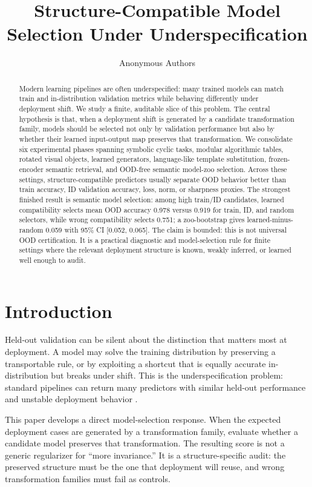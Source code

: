 \documentclass[10pt,twocolumn]{article}
\title{Structure-Compatible Model Selection Under Underspecification}
\author{Anonymous Authors}
\date{}
\begin{document}
\maketitle

\begin{abstract}
Modern learning pipelines are often underspecified: many trained models can
match train and in-distribution validation metrics while behaving differently
under deployment shift. We study a finite, auditable slice of this problem. The
central hypothesis is that, when a deployment shift is generated by a candidate
transformation family, models should be selected not only by validation
performance but also by whether their learned input-output map preserves that
transformation. We consolidate six experimental phases spanning symbolic cyclic
tasks, modular algorithmic tables, rotated visual objects, learned generators,
language-like template substitution, frozen-encoder semantic retrieval, and
OOD-free semantic model-zoo selection. Across these settings,
structure-compatible predictors usually separate OOD behavior better than train
accuracy, ID validation accuracy, loss, norm, or sharpness proxies. The strongest
finished result is semantic model selection: among high train/ID candidates,
learned compatibility selects mean OOD accuracy 0.978 versus 0.919 for train,
ID, and random selectors, while wrong compatibility selects 0.751; a
zoo-bootstrap gives learned-minus-random 0.059 with 95\% CI [0.052, 0.065].
The claim is
bounded: this is not universal OOD certification. It is a practical diagnostic
and model-selection rule for finite settings where the relevant deployment
structure is known, weakly inferred, or learned well enough to audit.
\end{abstract}

\section{Introduction}

Held-out validation can be silent about the distinction that matters most at
deployment. A model may solve the training distribution by preserving a
transportable rule, or by exploiting a shortcut that is equally accurate
in-distribution but breaks under shift. This is the underspecification problem:
standard pipelines can return many predictors with similar held-out performance
and unstable deployment behavior \citep{damour2022underspecification}.

This paper develops a direct model-selection response. When the expected
deployment cases are generated by a transformation family, evaluate whether a
candidate model preserves that transformation. The resulting score is not a
generic regularizer for ``more invariance.'' It is a structure-specific audit:
the preserved structure must be the one that deployment will reuse, and wrong
transformation families must fail as controls.
\end{document}
